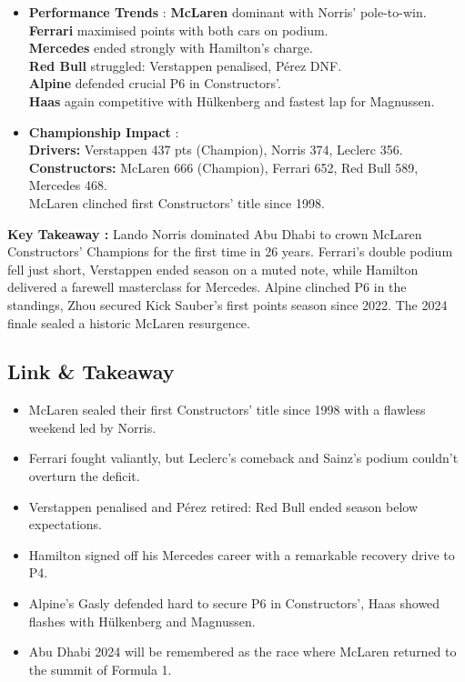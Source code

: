 \begin{itemize}
    \item \textbf{Performance Trends} : \textbf{McLaren} dominant with Norris’ pole-to-win.\\
    \textbf{Ferrari} maximised points with both cars on podium. \\
    \textbf{Mercedes} ended strongly with Hamilton’s charge. \\
    \textbf{Red Bull} struggled: Verstappen penalised, Pérez DNF. \\
    \textbf{Alpine} defended crucial P6 in Constructors’.\\
    \textbf{Haas} again competitive with Hülkenberg and fastest lap for Magnussen.

    \item \textbf{Championship Impact} : \\
    \textbf{Drivers:} Verstappen 437 pts (Champion), Norris 374, Leclerc 356. \\
    \textbf{Constructors:} McLaren 666 (Champion), Ferrari 652, Red Bull 589, Mercedes 468. \\
    McLaren clinched first Constructors’ title since 1998.
\end{itemize}

\textbf{Key Takeaway :} Lando Norris dominated Abu Dhabi to crown McLaren Constructors’ Champions for the first time in 26 years. Ferrari’s double podium fell just short, Verstappen ended season on a muted note, while Hamilton delivered a farewell masterclass for Mercedes. Alpine clinched P6 in the standings, Zhou secured Kick Sauber’s first points season since 2022. The 2024 finale sealed a historic McLaren resurgence.

\subsection{Link \& Takeaway}

\begin{itemize}
    \item McLaren sealed their first Constructors’ title since 1998 with a flawless weekend led by Norris. 
    \item Ferrari fought valiantly, but Leclerc’s comeback and Sainz’s podium couldn’t overturn the deficit. 
    \item Verstappen penalised and Pérez retired: Red Bull ended season below expectations. 
    \item Hamilton signed off his Mercedes career with a remarkable recovery drive to P4. 
    \item Alpine’s Gasly defended hard to secure P6 in Constructors’, Haas showed flashes with Hülkenberg and Magnussen. 
    \item Abu Dhabi 2024 will be remembered as the race where McLaren returned to the summit of Formula 1.
\end{itemize}
